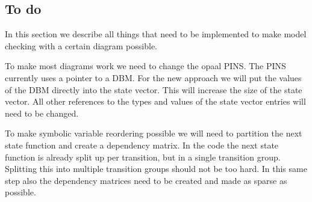 \documentclass[11pt]{article}
\begin{document}



\subsection{To do}
In this section we describe all things that need to be implemented to make model checking with a certain diagram possible. 

To make most diagrams work we need to change the opaal PINS. The PINS currently uses a pointer to a DBM. For the new approach we will put the values of the DBM directly into the state vector. This will increase the size of the state vector. All other references to the types and values of the state vector entries will need to be changed. 

To make symbolic variable reordering possible we will need to partition the next state function and create a dependency matrix. In the code the next state function is already split up per transition, but in a single transition group. Splitting this into multiple transition groups should not be too hard. In this same step also the dependency matrices need to be created and made as sparse as possible.
\end{document}
